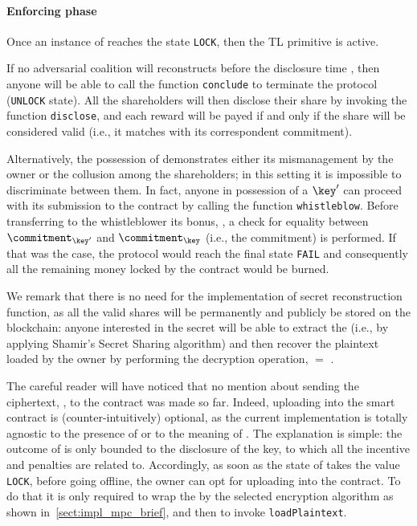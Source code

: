 \medskip

\paragraph*{Enforcing phase}\label{sect:impl_enf_brief}
Once an instance of \shortname reaches the state \texttt{LOCK}, then the TL primitive is active. 

If no adversarial coalition will reconstructs \key before the disclosure time \td, then anyone will be able to call the function \texttt{conclude} to terminate the protocol (\texttt{UNLOCK} state).
All the shareholders will then disclose their share by invoking the function \texttt{disclose}, and each reward will be payed if and only if the share will be  considered valid (i.e., it matches with its correspondent commitment).

Alternatively, the possession of \key demonstrates either its mismanagement by the owner or the collusion among the shareholders; in this setting it is impossible to discriminate between them.   
In fact, anyone in possession of a $\key \sp{\prime} $ can proceed with its submission to the contract by calling the function \texttt{whistleblow}. 
Before transferring to the whistleblower its bonus, \Wsecret, a check for equality between  $\commitment _ { \key \sp{\prime} } $ and $\commitment _ \key $ (i.e., the commitment) is performed. 
If that was the case, the protocol would reach the final state \texttt{FAIL} and consequently all the remaining money locked by the contract would be burned.

We remark that there is no need for the implementation of secret reconstruction function, as all the valid shares will be permanently and publicly be stored on the blockchain: anyone interested in the secret will be able to extract the \key (i.e., by applying Shamir's Secret Sharing algorithm) and then recover the plaintext loaded by the owner by performing the decryption operation, \plaintext $=$ \unwrap. 

The careful reader will have noticed that no mention about sending the ciphertext, \ciphertext, to the contract was made so far. 
Indeed, uploading \ciphertext into the smart contract is (counter-intuitively) optional, as the current implementation is totally agnostic to the presence of \ciphertext or to the meaning of \plaintext. 
The explanation is simple: the outcome of \shortname is only bounded to the disclosure of the key, to which all the incentive and penalties are related to. 
Accordingly, as soon as the state of \shortname takes the value \texttt{LOCK}, before going offline, the owner can opt for uploading \ciphertext into the contract. 
To do that it is only required to wrap the \plaintext by the selected encryption algorithm as shown in~\ref{sect:impl_mpc_brief}, and then to invoke \texttt{loadPlaintext}.

